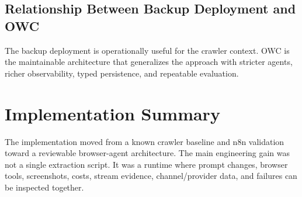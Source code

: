 \subsection{Relationship Between Backup Deployment and OWC}

The backup deployment is operationally useful for the crawler context. OWC is
the maintainable architecture that generalizes the approach with stricter
agents, richer observability, typed persistence, and repeatable evaluation.



\section{Implementation Summary}

The implementation moved from a known crawler baseline and n8n validation
toward a reviewable browser-agent architecture. The main engineering gain was
not a single extraction script. It was a runtime where prompt changes, browser
tools, screenshots, costs, stream evidence, channel/provider data, and failures
can be inspected together.
